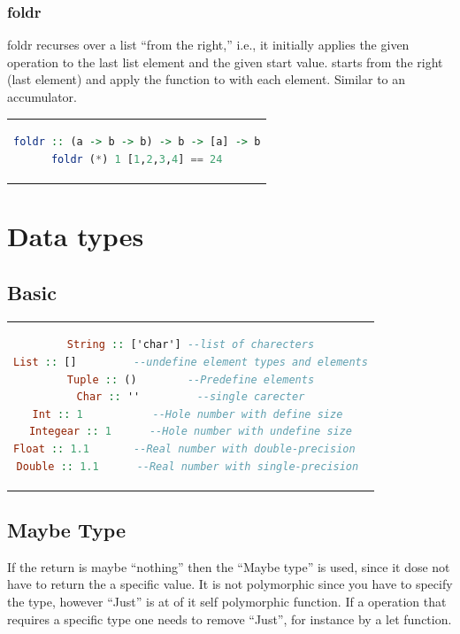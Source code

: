 \subsubsection{foldr}
foldr recurses over a list “from the right,” i.e., it initially applies the
given operation to the last list element and the given start value.
starts from the right (last element) and apply the function to with each element.
Similar to an accumulator.

\begin{center}
\begin{tabular}{c}
\begin{lstlisting}[language=Haskell]
foldr :: (a -> b -> b) -> b -> [a] -> b
foldr (*) 1 [1,2,3,4] == 24
\end{lstlisting}
\end{tabular}
\end{center}


\section{Data types}

\subsection{Basic}
\begin{center}
\begin{tabular}{c}
\begin{lstlisting}[language=Haskell]
String :: ['char'] --list of charecters
List :: []         --undefine element types and elements
Tuple :: ()        --Predefine elements
Char :: ''         --single carecter
Int :: 1           --Hole number with define size 
Integear :: 1      --Hole number with undefine size
Float :: 1.1       --Real number with double-precision  
Double :: 1.1      --Real number with single-precision 
\end{lstlisting}
\end{tabular}
\end{center}


\subsection{Maybe Type}
If the return is maybe ``nothing'' then the ``Maybe type'' is used, since it dose not have to return
the a specific value. It is not polymorphic since you have to specify the type, however
``Just'' is at of it self polymorphic function. If a operation that requires a specific type one needs to
remove ``Just'', for instance by a let function.


